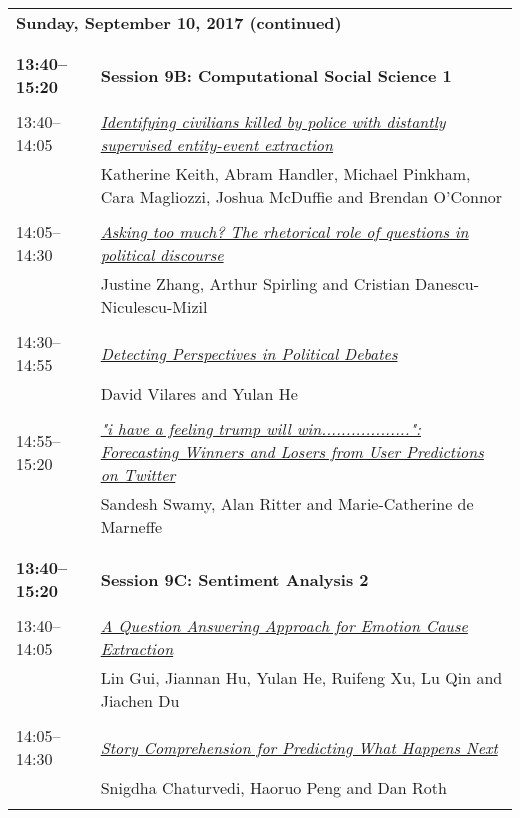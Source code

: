 \newpage
\begin{tabular}{p{20mm}p{128mm}}
\\
\multicolumn{2}{l}{\bf Sunday, September 10, 2017 (continued)} \\\\
\\{\bf 13:40--15:20} & {\bf Session 9B: Computational Social Science 1 } \\
\\
13:40--14:05 & \hyperlink{page.1546}{\em Identifying civilians killed by police with distantly supervised entity-event extraction}\\
         & Katherine Keith, Abram Handler, Michael Pinkham, Cara Magliozzi, Joshua McDuffie and Brendan O'Connor \\
\\

14:05--14:30 & \hyperlink{page.1557}{\em Asking too much? The rhetorical role of questions in political discourse}\\
         & Justine Zhang, Arthur Spirling and Cristian Danescu-Niculescu-Mizil \\
\\

14:30--14:55 & \hyperlink{page.1572}{\em Detecting Perspectives in Political Debates}\\
         & David Vilares and Yulan He \\
\\

14:55--15:20 & \hyperlink{page.1582}{\em "i have a feeling trump will win..................": Forecasting Winners and Losers from User Predictions on Twitter}\\
         & Sandesh Swamy, Alan Ritter and Marie-Catherine de Marneffe \\
\\

\\{\bf 13:40--15:20} & {\bf Session 9C: Sentiment Analysis 2 } \\
\\
13:40--14:05 & \hyperlink{page.1592}{\em A Question Answering Approach for Emotion Cause Extraction}\\
         & Lin Gui, Jiannan Hu, Yulan He, Ruifeng Xu, Lu Qin and Jiachen Du \\
\\

14:05--14:30 & \hyperlink{page.1602}{\em Story Comprehension for Predicting What Happens Next}\\
         & Snigdha Chaturvedi, Haoruo Peng and Dan Roth \\
\\


\end{tabular}

